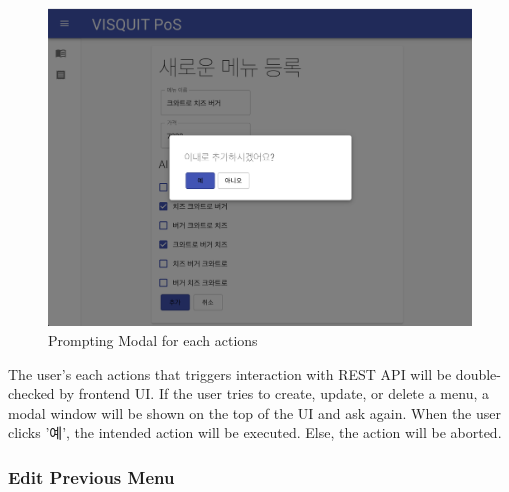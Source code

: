 \documentclass[conference,compsoc]{IEEEtran}
\begin{document}
\begin{figure}[ht!]
  \includegraphics[width=\linewidth]{figures/frontend/05-newmenu-modal.png}
  \caption{Prompting Modal for each actions}
  \label{fig:05-newmenu-modal}
\end{figure}

The user's each actions that triggers interaction with REST API will be double-checked by frontend UI. If the user tries to create, update, or delete a menu, a modal window will be shown on the top of the UI and ask again. When the user clicks '예', the intended action will be executed. Else, the action will be aborted.

\subsubsection{Edit Previous Menu}
\end{document}
